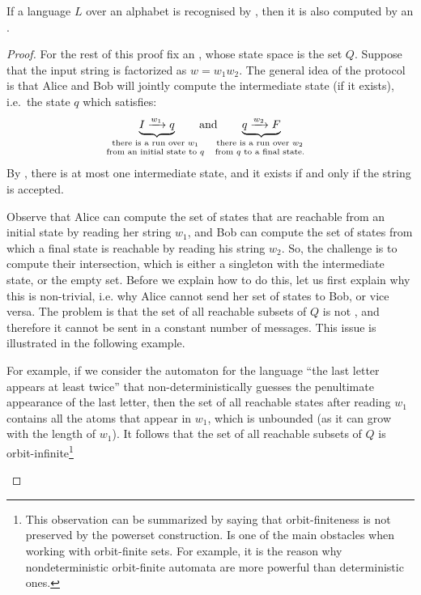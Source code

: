 \begin{theorem}
    \label{thm:unambiguous-to-protocol}
    If a language $L$ over an  alphabet is recognised by 
    , then 
    it is also computed by an .
\end{theorem}
\begin{proof}
  For the rest of this proof fix an , whose state space is the  set $Q$.
Suppose that the input string is factorized as $w = w_1 w_2$. The general idea of the protocol is that Alice and Bob will jointly
compute the intermediate state (if it exists), i.e.~the state $q$ which satisfies:
\begin{align*}
\myunderbrace{I \xrightarrow{w_1}q}{there is a run over $w_1$\\ from an initial state to $q$} \qquad \text{and} \qquad
\myunderbrace{q \xrightarrow{w_2} F}{there is a run over $w_2$\\ from $q$ to a final state.}
\end{align*}
By , there is at most one intermediate state, and it exists if and only if the string is accepted.

Observe that Alice can compute the set of states that are reachable from an
initial state by reading her string $w_1$, and Bob can compute the set of
states from which a final state is reachable by reading his string $w_2$. So,
the challenge is to compute their intersection, which is either a singleton
with the intermediate state, or the empty set. Before we explain how to do
this, let us first explain why this is non-trivial, i.e. why Alice cannot send
her set of states to Bob, or vice versa. The problem is that the set of all
reachable subsets of $Q$ is not , and therefore it cannot be sent
in a constant number of messages. This issue is illustrated in the following
example.

\begin{myexample}
    For example, if we consider the automaton for the language ``the last letter appears at least twice'' that non-deterministically guesses the penultimate appearance of the last letter, 
then the set of all reachable states after reading $w_1$ contains all the atoms that appear in $w_1$, which is unbounded (as it can grow with the length of $w_1$).
 It follows
that the set of all reachable subsets of $Q$ is orbit-infinite\footnote{
This observation can be summarized by saying that orbit-finiteness
is not preserved by the powerset construction. Is one of the main obstacles when working with orbit-finite sets. For example, it is the reason why nondeterministic orbit-finite automata are more powerful than deterministic ones.}
\end{myexample}


\end{proof}
